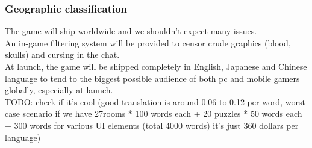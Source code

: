 \subsubsection{Geographic classification}
The game will ship worldwide and we shouldn't expect many issues. \\

An in-game filtering system will be provided to censor crude graphics (blood, skulls) and cursing in the chat. \\

At launch, the game will be shipped completely in English, Japanese and Chinese language to tend to the biggest possible audience of both pc and mobile gamers globally, especially at launch. \\

TODO: check if it's cool (good translation is around 0.06 to 0.12 per word, worst case scenario if we have 27rooms * 100 words each + 20 puzzles * 50 words each + 300 words for various UI elements (total 4000 words) it's just 360 dollars per language)
